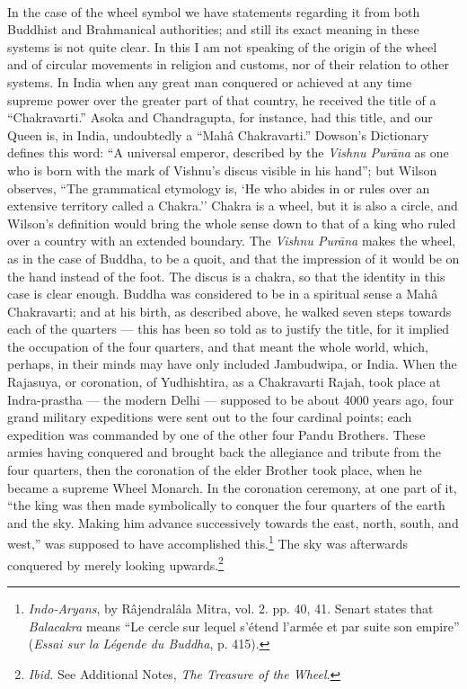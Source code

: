 \documentclass[a4paper, 11pt, oneside, polutonikogreek, english]{article}
\begin{document}
\paragraph{}
In the case of the wheel symbol we have statements regarding it from both Buddhist and Brahmanical authorities; and still its exact meaning in these systems is not quite clear. In this I am not speaking of the origin of the wheel and of circular movements in religion and customs, nor of their relation to other systems. In India when any great man conquered or achieved at any time supreme power over the greater part of that country, he received the title of a ``Chakravarti.'' Asoka and Chandragupta, for instance, had this title, and our Queen is, in India, undoubtedly a ``Mahâ Chakravarti.'' Dowson's Dictionary defines this word: ``A universal emperor, described by the \emph{Vishnu Purāna} as one who is born with the mark of Vishnu's discus visible in his hand''; but Wilson observes, ``The grammatical etymology is, `He who abides in or rules over an extensive territory called a Chakra.'' Chakra is a wheel, but it is also a circle, and Wilson's definition would bring the whole sense down to that of a king who ruled over a country with an extended boundary. The \emph{Vishnu Purāna} makes the wheel, as in the case of Buddha, to be a quoit, and that the impression of it would be on the hand instead of the foot. The discus is a chakra, so that the identity in this case is clear enough. Buddha was considered to be in a spiritual sense a Mahâ Chakravarti; and at his birth, as described above, he walked seven steps towards each of the quarters --- this has been so told as to justify the title, for it implied the occupation of the four quarters, and that meant the whole world, which, perhaps, in their minds may have only included Jambudwipa, or India. When the Rajasuya, or coronation, of Yudhishtira, as a Chakravarti Rajah, took place at Indra-prastha --- the modern Delhi --- supposed to be about 4000 years ago, four grand military expeditions were sent out to the four cardinal points; each expedition was commanded by one of the other four Pandu Brothers. These armies having conquered and brought back the allegiance and tribute from the four quarters, then the coronation of the elder Brother took place, when he became a supreme Wheel Monarch. In the coronation ceremony, at one part of it, ``the king was then made symbolically to conquer the four quarters of the earth and the sky. Making him advance successively towards the east, north, south, and west,'' was supposed to have accomplished this.\footnote{\emph{Indo-Aryans}, by Râjendralâla Mitra, vol. 2. pp. 40, 41. Senart states that \emph{Balacakra} means ``Le cercle sur lequel s'étend l'armée et par suite son empire'' (\emph{Essai sur la Légende du Buddha}, p. 415).} The sky was afterwards conquered by merely looking upwards.\footnote{\emph{Ibid.} See Additional Notes, \emph{The Treasure of the Wheel}.}
\end{document}
